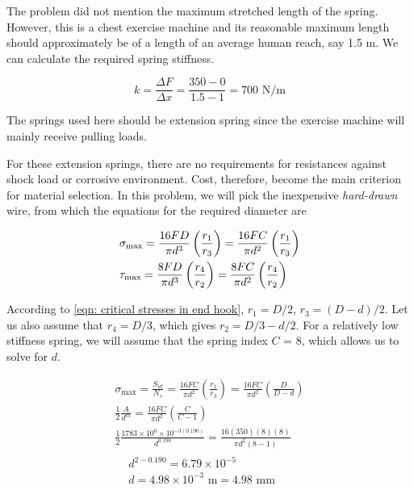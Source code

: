 \documentclass[
10pt,
a4paper,
openany,
svgnames,
]{book}
\begin{document}
The problem did not mention the maximum stretched length of the spring. However, this is a chest exercise machine and its reasonable maximum length should approximately be of a length of an average human reach, say 1.5 m. We can calculate the required spring stiffness.

\[k = \frac{\Delta F}{\Delta x} = \frac{350 - 0}{1.5 - 1} = 700\text{ N/m}\]

The springs used here should be extension spring since the exercise machine will mainly receive pulling loads.

For these extension springs, there are no requirements for resistances against shock load or corrosive environment. Cost, therefore, become the main criterion for material selection. In this problem, we will pick the inexpensive \emph{hard-drawn} wire, from which the equations for the required diameter are

\[\begin{gathered}
  \sigma_{\max} = \frac{16FD}{\pi d^3}\left( \frac{r_1}{r_3} \right) = \frac{16FC}{\pi d^2}\left( \frac{r_1}{r_3} \right) \hfill \\
  \tau_{\max} = \frac{8FD}{\pi d^3}\left( \frac{r_4}{r_2} \right) = \frac{8FC}{\pi d^2}\left( \frac{r_4}{r_2} \right) \hfill \\ 
\end{gathered} \]

According to \cref{eqn: critical stresses in end hook}, $r_1 = D / 2$, $r_3 = (D - d) / 2$. Let us also assume that $r_4 = D / 3$, which gives $r_2 = D / 3 - d / 2$. For a relatively low stiffness spring, we will assume that the spring index $C$ = 8, which allows us to solve for $d$.

\begin{gather*}
  \sigma_{\max} = \frac{S_{ut}}{N_s} = \frac{16FC}{\pi d^2}\left( \frac{r_1}{r_3} \right) = \frac{16FC}{\pi d^2}\left( \frac{D}{D - d} \right) \\
  \frac{1}{2}\frac{A}{d^m} = \frac{16FC}{\pi d^2}\left( \frac{C}{C - 1} \right) \\ 
  \frac{1}{2}\frac{1783 \times 10^6 \times 10^{-3(0.190)}}{d^{0.190}} = \frac{16(350)(8)(8)}{\pi d^2(8 - 1)} \\
  \begin{aligned}
  &d^{2-0.190} = 6.79 \times 10^{-5} \\ 
  &d = 4.98 \times 10^{-3} \text{ m} = 4.98\text{ mm}
  \end{aligned}
\end{gather*}
\end{document}
